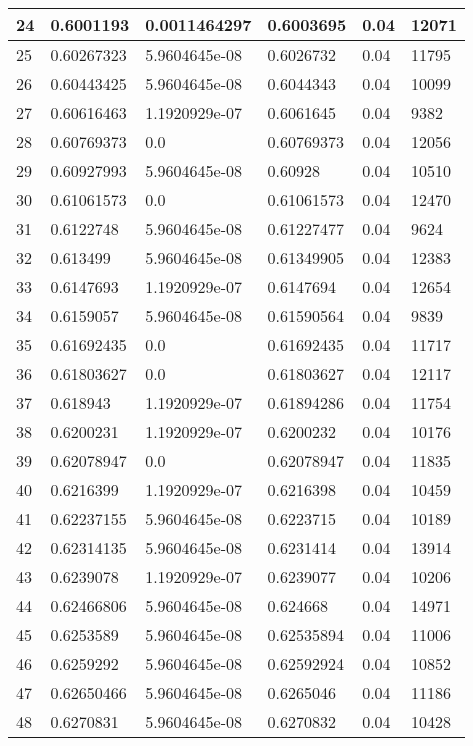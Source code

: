 \begin{longtable}{|l|l|l|l|l|l|}
24 & 0.6001193 & 0.0011464297 & 0.6003695 & 0.04 & 12071 \\ \hline 
25 & 0.60267323 & 5.9604645e-08 & 0.6026732 & 0.04 & 11795 \\ \hline 
26 & 0.60443425 & 5.9604645e-08 & 0.6044343 & 0.04 & 10099 \\ \hline 
27 & 0.60616463 & 1.1920929e-07 & 0.6061645 & 0.04 & 9382 \\ \hline 
28 & 0.60769373 & 0.0 & 0.60769373 & 0.04 & 12056 \\ \hline 
29 & 0.60927993 & 5.9604645e-08 & 0.60928 & 0.04 & 10510 \\ \hline 
30 & 0.61061573 & 0.0 & 0.61061573 & 0.04 & 12470 \\ \hline 
31 & 0.6122748 & 5.9604645e-08 & 0.61227477 & 0.04 & 9624 \\ \hline 
32 & 0.613499 & 5.9604645e-08 & 0.61349905 & 0.04 & 12383 \\ \hline 
33 & 0.6147693 & 1.1920929e-07 & 0.6147694 & 0.04 & 12654 \\ \hline 
34 & 0.6159057 & 5.9604645e-08 & 0.61590564 & 0.04 & 9839 \\ \hline 
35 & 0.61692435 & 0.0 & 0.61692435 & 0.04 & 11717 \\ \hline 
36 & 0.61803627 & 0.0 & 0.61803627 & 0.04 & 12117 \\ \hline 
37 & 0.618943 & 1.1920929e-07 & 0.61894286 & 0.04 & 11754 \\ \hline 
38 & 0.6200231 & 1.1920929e-07 & 0.6200232 & 0.04 & 10176 \\ \hline 
39 & 0.62078947 & 0.0 & 0.62078947 & 0.04 & 11835 \\ \hline 
40 & 0.6216399 & 1.1920929e-07 & 0.6216398 & 0.04 & 10459 \\ \hline 
41 & 0.62237155 & 5.9604645e-08 & 0.6223715 & 0.04 & 10189 \\ \hline 
42 & 0.62314135 & 5.9604645e-08 & 0.6231414 & 0.04 & 13914 \\ \hline 
43 & 0.6239078 & 1.1920929e-07 & 0.6239077 & 0.04 & 10206 \\ \hline 
44 & 0.62466806 & 5.9604645e-08 & 0.624668 & 0.04 & 14971 \\ \hline 
45 & 0.6253589 & 5.9604645e-08 & 0.62535894 & 0.04 & 11006 \\ \hline 
46 & 0.6259292 & 5.9604645e-08 & 0.62592924 & 0.04 & 10852 \\ \hline 
47 & 0.62650466 & 5.9604645e-08 & 0.6265046 & 0.04 & 11186 \\ \hline 
48 & 0.6270831 & 5.9604645e-08 & 0.6270832 & 0.04 & 10428 \\ \hline 

\end{longtable}
